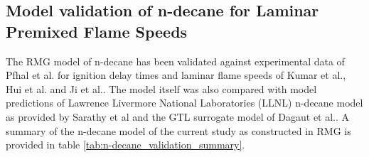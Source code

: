 \subsection{Model validation of n-decane for Laminar Premixed Flame Speeds}
The RMG model of n-decane has been validated against experimental data of Pfhal et al.\cite{Pfahl1996Self-ignitionConditions} for ignition delay times and laminar flame speeds of Kumar et al.\cite{KUMAR2007209}, Hui et al.\cite{Hui2013LaminarPressures} and Ji et al.\cite{Ji2010PropagationFlames}. The model itself was also compared with model predictions of Lawrence Livermore National Laboratories (LLNL) n-decane model as provided by Sarathy et al\cite{Sarathy2011ComprehensiveC20} and the GTL surrogate model of Dagaut et al.\cite{Dagaut2014}. A summary of the n-decane model of the current study as constructed in RMG is provided in table \ref{tab:n-decane_validation_summary}. 



